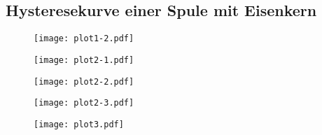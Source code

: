 \subsection{Hysteresekurve einer Spule mit Eisenkern}

\begin{table}[H]
  \centering
  \label{tab:messwerte}
\end{table}

\begin{figure}
  \texttt{[image: plot1-2.pdf]}
\end{figure}
\begin{figure}
  \texttt{[image: plot2-1.pdf]}
\end{figure}
\begin{figure}
  \texttt{[image: plot2-2.pdf]}
\end{figure}
\begin{figure}
  \texttt{[image: plot2-3.pdf]}
\end{figure}
\begin{figure}
  \texttt{[image: plot3.pdf]}
\end{figure}


